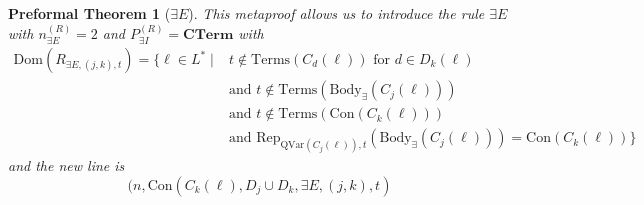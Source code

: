 \documentclass[oneside, 12pt]{book}
\theoremstyle{break}
\newtheorem{preformal definition}[definition]{Preformal Definition}
\newtheorem{preformal theorem}[theorem]{Preformal Theorem}
\newcommand{\bv}[1]{\boldsymbol{#1}}
\begin{document}
\begin{preformal theorem}[$\exists E$]
			This metaproof allows us to introduce the rule $\exists E$ with $n_{\exists E}^{(R)}=2$ and $P_{\exists I}^{(R)} = \textbf{CTerm}$ with
			\begin{align*}
				\text{Dom}(R_{\exists E, (j, k), t}) = \{\bv{\ell} \in L^* \mid &t \not \in \text{Terms}(C_d(\bv{\ell})) \text{ for } d \in D_k(\bv{\ell})\\
				&\text{and } t \not \in \text{Terms}(\text{Body}_{\exists}(C_j(\bv{\ell})))\\
				&\text{and } t \not \in \text{Terms}(\text{Con}(C_k(\bv{\ell})))\\
				&\text{and } \text{Rep}_{\text{QVar}(C_j(\bv{\ell})), t}(\text{Body}_{\exists}(C_j(\bv{\ell}))) = \text{Con}(C_k(\bv{\ell}))\}
			\end{align*}
			and the new line is
			\begin{equation*}
				(n, \text{Con}(C_k(\bv{\ell}), D_j \cup D_k, \exists E, (j, k), t)
			\end{equation*}
		\end{preformal theorem}
		
\end{document}
